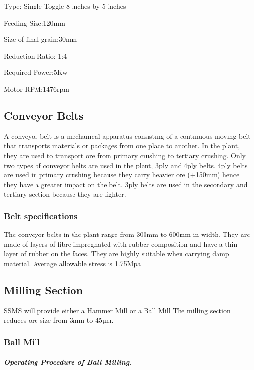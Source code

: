 \noindent Type:  Single Toggle 8 inches by 5 inches

\noindent Feeding Size:120mm

\noindent Size of final grain:30mm

\noindent Reduction Ratio: 1:4

\noindent Required Power:5Kw

\noindent Motor RPM:1476rpm


\subsection{ Conveyor Belts}

\noindent A conveyor belt is a mechanical apparatus consisting of a continuous moving belt that transports materials or packages from one place to another. In the plant, they are used to transport ore from primary crushing to tertiary crushing. Only two types of conveyor belts are used in the plant, 3ply and 4ply belts. 4ply belts are used in primary crushing because they carry heavier ore (+150mm) hence they have a greater impact on the belt. 3ply belts are used in the secondary and tertiary section because they are lighter.\par


\subsubsection{  Belt specifications}

\noindent The conveyor belts in the plant range from 300mm to 600mm in width. They are made of layers of fibre impregnated with rubber composition and have a thin layer of rubber on the faces. They are highly suitable when carrying damp material. Average allowable stress is 1.75Mpa\par


\subsection{ Milling Section}

\noindent SSMS will provide either a Hammer Mill or a Ball Mill The milling section reduces ore size from 3mm to 45µm.\par


\subsubsection{ Ball Mill}


\subparagraph{ Operating Procedure of Ball Milling.}

